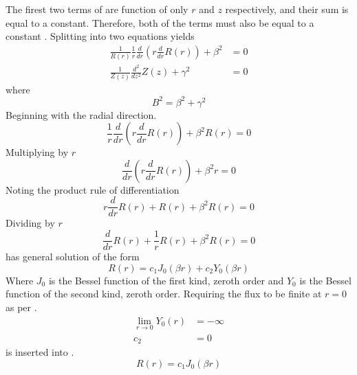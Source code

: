   The firest two terms of  are function of only $r$ and
  $z$ respectively, and their sum is equal to a constant. Therefore, both of the
  terms must also be equal to a constant \cite{lamarsh1966}. Splitting
   into two equations yields
  \begin{align}
    \frac{1}{R(r)} \frac{1}{r} \frac{d}{dr} \left( r \frac{d}{dr} R(r) \right) +
      \beta^2 &= 0 \\
    \label{eq:finite_cyl_zeq}
    \frac{1}{Z(z)} \frac{d^2}{dz^2} Z(z) + \gamma^2 &= 0
  \end{align}
  where
  \begin{equation}
    \label{eq:finite_cyl_b2_sum}
    B^2 = \beta^2 + \gamma^2
  \end{equation}
  Beginning with the radial direction.
  \begin{equation}
    \frac{1}{r} \frac{d}{dr} \left( r \frac{d}{dr} R(r) \right) + \beta^2 R(r) =
    0
  \end{equation}
  Multiplying by $r$
  \begin{equation}
    \frac{d}{dr} \left( r \frac{d}{dr} R(r) \right) + \beta^2 r = 0
  \end{equation}
  Noting the product rule of differentiation
  \begin{equation}
    r \frac{d}{dr} R(r) + R(r) + \beta^2 R(r) = 0
  \end{equation}
  Dividing by $r$
  \begin{equation}
    \label{eq:finite_cyl_bessel}
    \frac{d}{dr} R(r) + \frac{1}{r} R(r) + \beta^2 R(r) = 0
  \end{equation}
   has general solution of the form
  \begin{equation}
    \label{eq:finite_cyl_bessel_general}
    R(r) = c_1 J_0(\beta r ) + c_2 Y_0(\beta r)
  \end{equation}
  Where $J_0$ is the Bessel function of the first kind, zeroth order and $Y_0$
  is the Bessel function of the second kind, zeroth order. Requiring the flux to
  be finite at $r=0$ as per .
  \begin{align}
    \lim_{r \rightarrow 0} Y_0(r) &= - \infty \\
    \label{eq:finite_cyl_c2}
    c_2 &= 0
  \end{align}
   is inserted into .
  \begin{equation}
    \label{eq:finite_cyl_j0}
    R(r) = c_1 J_0(\beta r)
  \end{equation}
